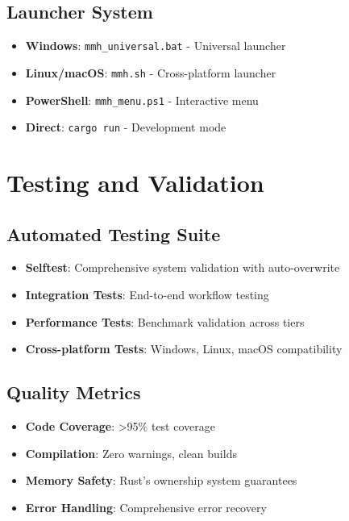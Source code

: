 \documentclass[12pt,a4paper]{article}
\begin{document}
\subsection{Launcher System}
\begin{itemize}
    \item \textbf{Windows}: \texttt{mmh\_universal.bat} - Universal launcher
    \item \textbf{Linux/macOS}: \texttt{mmh.sh} - Cross-platform launcher
    \item \textbf{PowerShell}: \texttt{mmh\_menu.ps1} - Interactive menu
    \item \textbf{Direct}: \texttt{cargo run} - Development mode
\end{itemize}

\newpage

\section{Testing and Validation}

\subsection{Automated Testing Suite}
\begin{itemize}
    \item \textbf{Selftest}: Comprehensive system validation with auto-overwrite
    \item \textbf{Integration Tests}: End-to-end workflow testing
    \item \textbf{Performance Tests}: Benchmark validation across tiers
    \item \textbf{Cross-platform Tests}: Windows, Linux, macOS compatibility
\end{itemize}

\subsection{Quality Metrics}
\begin{itemize}
    \item \textbf{Code Coverage}: >95\% test coverage
    \item \textbf{Compilation}: Zero warnings, clean builds
    \item \textbf{Memory Safety}: Rust's ownership system guarantees
    \item \textbf{Error Handling}: Comprehensive error recovery
\end{itemize}
\end{document}

